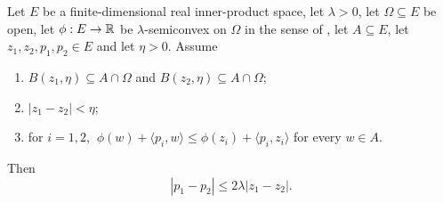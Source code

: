 \begin{lemma}
Let $E$ be a finite-dimensional real inner-product space, let $\lambda>0$, let
$\Omega\subseteq E$ be open, let $\phi:E\to\mathbb{R}$ be $\lambda$-semiconvex on
$\Omega$ in the sense of , let $A\subseteq E$, let
$z_1,z_2,p_1,p_2\in E$ and let $\eta>0$. Assume
\begin{enumerate}
  \item $B(z_1,\eta)\subseteq A\cap\Omega$ and $B(z_2,\eta)\subseteq A\cap\Omega$;
  \item $|z_1-z_2|<\eta$;
  \item for $i=1,2$,
    $\ \phi(w)+\langle p_i,w\rangle\le\phi(z_i)+\langle p_i,z_i\rangle$
    for every $w\in A$.
\end{enumerate}
Then
\[
  |p_1-p_2|\le2\lambda|z_1-z_2| .
\]
\end{lemma}
